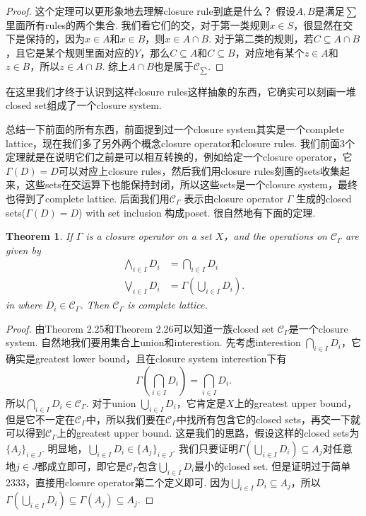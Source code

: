 \documentclass{article}
\newtheorem{theorem}{Theorem}[section]
\begin{document}
\begin{proof}
这个定理可以更形象地去理解closure rule到底是什么？ 假设$A,B$是满足$\sum$里面所有rules的两个集合. 我们看它们的交，对于第一类规则$x \in S$，很显然在交下是保持的，因为$x \in A$和$x \in B$，则$x \in A \cap B$. 对于第二类的规则，若$C \subseteq A \cap B$，且它是某个规则里面对应的$Y$，那么$C \subseteq A$和$C \subseteq B$，对应地有某个$z \in A$和$z \in B$，所以$z \in A\cap B$. 综上$A \cap B$也是属于$\mathcal{C}_{\sum}$.
\end{proof}

{\color{blue} 在这里我们才终于认识到这样closure rules这样抽象的东西，它确实可以刻画一堆closed set组成了一个closure system}.

{\color{red} 总结一下前面的所有东西，前面提到过一个closure system其实是一个complete lattice，现在我们多了另外两个概念closure operator和closure rules. 我们前面3个定理就是在说明它们之前是可以相互转换的，例如给定一个closure operator，它$\Gamma(D) = D$可以对应上closure rules，然后我们用closure rules刻画的sets收集起来，这些sets在交运算下也能保持封闭，所以这些sets是一个closure system，最终也得到了complete lattice}. {\color{blue} 后面我们用$\mathcal{C}_\Gamma$ 表示由closure operator $\Gamma$ 生成的closed sets($\Gamma(D)=D$) with set inclusion 构成poset}. 很自然地有下面的定理.

\begin{theorem}
\rm If $\Gamma$ is a closure operator on a set $X$，and {\color{red} the operations on $\mathcal{C}_\Gamma$} are given by 
$$
\begin{aligned}
\bigwedge\limits_{i \in I} D_i &= \bigcap\limits_{i \in I} D_i \\
\bigvee\limits_{i \in I} D_i &= \Gamma(\bigcup\limits_{i \in I} D_i).
\end{aligned}
$$
in where $D_i \in \mathcal{C}_{\Gamma}$. Then $\mathcal{C}_\Gamma$ is complete lattice.
\end{theorem}

\begin{proof}
由Theorem 2.25和Theorem 2.26可以知道一族closed set $\mathcal{C}_{\Gamma}$是一个closure system. 自然地我们要用集合上union和interestion. 先考虑interestion $\bigcap\limits_{i \in I} D_i$，它确实是greatest lower bound，且在closure system interestion下有
$$
\Gamma(\bigcap\limits_{i \in I} D_i) = \bigcap\limits_{i \in I} D_i.
$$
所以$\bigcap\limits_{i \in I} D_i \in \mathcal{C}_{\Gamma}$. 对于union $\bigcup\limits_{i \in I} D_i$，它肯定是$X$上的greatest upper bound，但是它不一定在$\mathcal{C}_{\Gamma}$中，所以我们要在$\mathcal{C}_{\Gamma}$中找所有包含它的closed sets，再交一下就可以得到$\mathcal{C}_{\Gamma}$上的greatest upper bound. 这是我们的思路，假设这样的closed sets为$\{A_j\}_{i \in J}$. 明显地，$\bigcup\limits_{i \in I} D_i \in \{A_j\}_{i \in J}$. 我们只要证明$\Gamma(\bigcup\limits_{i \in I} D_i) \subseteq A_j$对任意地$j \in J$都成立即可，即它是$\mathcal{C}_{\Gamma}$包含$\bigcup\limits_{i \in I} D_i$最小的closed set. 但是证明过于简单2333，直接用closure operator第二个定义即可. 因为$\bigcup\limits_{i \in I} D_i \subseteq A_j$，所以$\Gamma(\bigcup\limits_{i \in I} D_i) \subseteq \Gamma(A_j) \subseteq A_j$. 
\end{proof}
\end{document}
